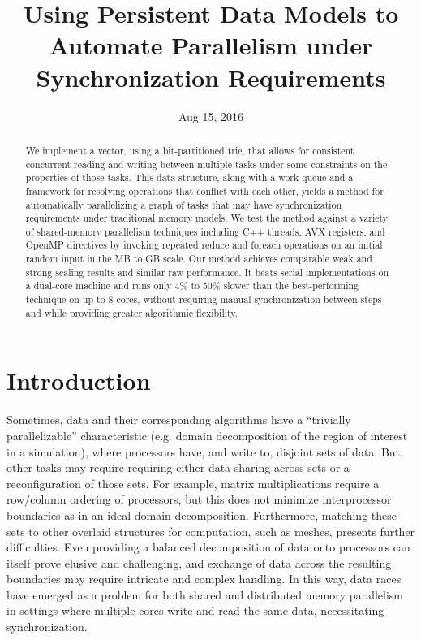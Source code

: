 \documentclass[pageno]{jpaper}
\begin{document}
\title{
Using Persistent Data Models to Automate Parallelism under Synchronization Requirements}

\date{Aug 15, 2016}
\maketitle

\thispagestyle{empty}

\begin{abstract}
We implement a vector, using a bit-partitioned trie, that allows for consistent
concurrent reading and writing between multiple tasks under some constraints on
the properties of those tasks. This data structure, along with a work queue and
a framework for resolving operations that conflict with each other, yields a
method for automatically parallelizing a graph of tasks that may have
synchronization requirements under traditional memory models. We test the
method against a variety of shared-memory parallelism techniques including C++
threads, AVX registers, and OpenMP directives by invoking repeated reduce and
foreach operations on an initial random input in the MB to GB scale. Our method
achieves comparable weak and strong scaling results and similar raw
performance. It beats serial implementations on a dual-core machine and runs
only 4\% to 50\% slower than the best-performing technique on up to 8 cores,
without requiring manual synchronization between steps and while providing
greater algorithmic flexibility.
\end{abstract}

\section{Introduction}
Sometimes, data and their corresponding algorithms have a ``trivially
parallelizable'' characteristic (e.g. domain decomposition of the region of
interest in a simulation), where processors have, and write to, disjoint sets of
data. But, other tasks may require requiring either data sharing across sets or
a reconfiguration of those sets. For example, matrix multiplications require a
row/column ordering of processors, but this does not minimize interprocessor
boundaries as in an ideal domain decomposition. Furthermore, matching these sets
to other overlaid structures for computation, such as meshes, presents further
difficulties. Even providing a balanced decomposition of data onto processors
can itself prove elusive and challenging, and exchange of data across the
resulting boundaries may require intricate and complex handling. In this way,
data races have emerged as a problem for both shared and distributed memory
parallelism in settings where multiple cores write and read the same data,
necessitating synchronization. 
\end{document}
